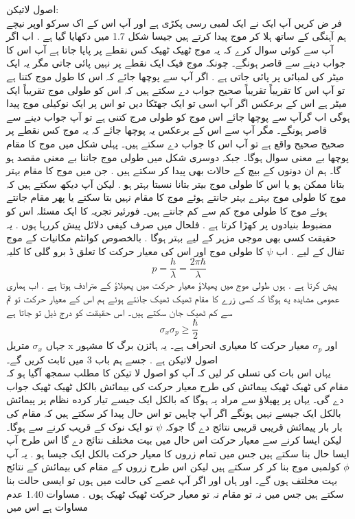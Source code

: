 \documentclass{book}
\begin{document}
%
اصول لاتیکن:\\
فر ض کریں آپ ایک نے ایک لمبی رسی پکڑی ہے اور آپ اس کے اک سرکو اوپر نیچے ہم آہنگی کے ساتھ ہلا کر موج پیدا کرتے ہیں جیسا شکل 1.7 میں دکھایا گیا ہے . اب اگر آپ سے کوئی سوال کرے کہ یہ موج ٹھیک ٹھیک کس نقطے پر پایا جاتا ہے آپ اس کا جواب دینے سے قاصر ہونگے۔ چونکہ موج فیک ایک نقطے پر نہیں پائی جاتی مگر یہ ایک میٹر کی لمبائی پر پائی جاتی ہے . اگر آپ سے پوچھا جائے کہ اس کا طول موج کتنا ہے تو آپ اس کا تقریباً تقریباً صحیح جواب دے سکتے ہیں کہ اس کو طولی موج تقریباً ایک میٹر ہے اس کے برعکس اگر آپ اسی تو ایک جھٹکا دیں تو اس پر ایک نوکیلی موج پیدا ہوگی اب گرآپ سے پوچھا جائے اس موج کو طولی مرج کتنی ہے تو آپ جواب دینے سے قاصر ہونگے۔ مگر آپ سے اس کے برعکس یہ پوچھا جائے کہ یہ موج کس نقطے پر صحیح صحیح واقع ہے تو آپ اس کا جواب دے سکتے ہیں۔ پہلی شکل میں موج کا مقام پوچھا بے معنی سوال ہوگا۔ جبکہ دوسری شکل میں طولی موج جاننا بے معنی مقصد ہو گا۔ ہم ان دونوں کے بیچ کے حالات بھی پیدا کر سکتے ہیں . جن میں موج کا مقام بہتر بتانا ممکن ہو یا اس کا طولی موج بیتر بتانا نسبتا بہتر ہو . لیکن آپ دیکھ سکتے ہیں کہ موج کا طولی موج بہترے بہتر جانتے ہوئے موج کا مقام نہیں بتا سکتے یا پھر مقام جانتے ہوئے موج کا طولی موج کم سے کم جانتے ہیں۔ فورئیر تجریہ کا ایک مسئلہ اس کو مضبوط بنیادوں پر کھڑا کرتا ہے . فلحال میں صرف کیفی دلائل پیش کررہا ہوں . یہ حقیقت کسی بھی موجی مزہر کے لیے بہتر ہوگا . بالخصوص کوانٹم مکانیات کے موج تفال کے لیے . اب
\(\psi\) 
کا طولی موج اور اس کی معیار حرکت کا تعلق  ڈ برو گلی
کا کلیہ
\[p=\frac{h}{\lambda}=\frac{2\pi\hbar}{\lambda}\]
پیش کرتا ہے .
ہوں طولی موج میں پھیلاؤ معیار حرکت میں پھیلاؤ کے مترادف ہوتا ہے . اب ہماری عمومی مشایده یه ہوگا کہ کسی زرے کا مقام ٹھیک ٹھیک جانتے ہوئے ہم اس کے معیار حرکت تو تم سے کم ٹھیک جان سکتے ہیں۔ اس حقیقت کو درج ذیل تو جاتا ہے
\[\sigma_{x}\sigma_{p}\ge\frac{\hbar}{2}\]
جہاں
\(\sigma _{x} \) 
متریل x اور
\(\sigma _{p} \) 
معیار حرکت کا معیاری انحراف ہے۔ یہ ہائزن برگ کا مشہور اصول لاتیکن ہے . جسے ہم باب 3 میں ثابت کریں گے۔ \\
یہاں اس بات کی تسلی کر لیں کہ آپ کو اصول لا تیکن کا مطلب سمجھ آگیا ہو  کہ مقام کی ٹھیک ٹھیک پیمائش کی طرح معیار حرکت کی بیمائش بالکل ٹھیک ٹھیک جواب دے گی۔ یہاں پر پھیلاؤ سے مراد یہ ہوگا که بالکل ایک جیسے تیار کرده نظام پر پیمائش بالکل ایک جیسے نہیں ہونگے اگر آپ چاہیں تو اس حال پیدا کر سکتے ہیں کہ مقام کی بار بار پیمائش قریبی قریبی نتائج دے گا جوکہ
\(\psi\) 
تو ایک نوک کے قریب کرنے سے ہوگا۔ لیکن ایسا کرنے سے معیار حرکت اس حال میں بيت مختلف نتائج دے گا اس طرح آپ ایسا حال بنا سکتے ہیں جس میں تمام زروں کا معیار حرکت بالکل ایک جیسا ہو . یہ آپ
\(\phi\) 
کولمبی موج بنا کر کر سکتے ہیں لیکن اس طرح زروں کے مقام کی بیمائش کے نتائج بہت مخلتف ہوں گے۔ اور ہاں اور اگر آپ غصے کی حالت میں ہوں تو ایسی حالت بنا سکتے ہیں جس میں نہ تو مقام نہ تو معیار حرکت ٹھیک ٹھیک ہوں . مساوات 1.40 عدم مساوات ہے اس میں
\end{document}
